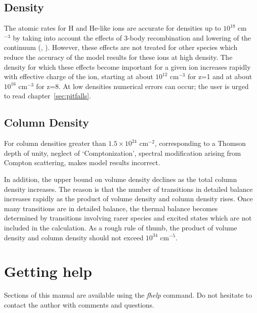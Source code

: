 \subsection{Density}

The atomic rates for H and He-like ions are accurate for densities up to 
$10^{18}$ cm$^{-3}$ by taking into account the effects of 3-body
recombination and lowering of the continuum (\cite{bautista1998},
\cite{bautista1999}). However, these effects are not treated for 
other species which reduce the accuracy of the model results for these 
ions at high density. The density for which 
these effects become important for a given ion increases rapidly with effective charge of
the ion, starting at about $10^{12}$ cm$^{-3}$ for z=1 and at about 
$10^{16}$ cm$^{-3}$ for z=8.  At low densities numerical errors can occur;
the user is urged to read chapter~\ref{sec:pitfalls}.

\subsection{Column Density}

For column densities greater than $1.5 \times 10^{24}$ cm$^{-2}$, 
corresponding to a Thomson depth of unity, neglect of 
`Comptonization', spectral modification arising from Compton scattering, 
makes model results incorrect.

 In addition, the upper bound on
volume density declines as the total column density increases.  The
reason is that the number of transitions in detailed balance increases
rapidly as the product of volume density and column density rises.  Once
many transitions are in detailed balance, the thermal balance becomes
determined by transitions involving rarer species and excited states
which are not included in the calculation.  As a rough rule of thumb,
the product of volume density and column density should not exceed
$10^{34}$ cm$^{-5}$.

\section{Getting help}

Sections of this manual are available using the {\it fhelp} command.
Do not hesitate to contact the author with comments and questions.
